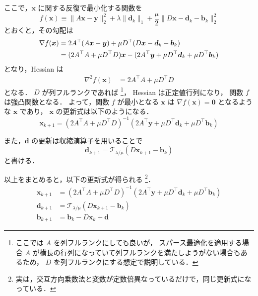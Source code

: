ここで，$\bm{x}$ に関する反復で最小化する関数を
\begin{equation}
    f(\bm{x}) \equiv \|A \bm{x} - \bm{y}\|_2^2 + \lambda \|\bm{d}_k\|_1
    + \frac{\mu}{2} \|D \bm{x} - \bm{d}_k - \bm{b}_k\|_2^2
\end{equation}
とおくと，その勾配は
\begin{align}
    \nabla f(\bm{x})
     & =
    2 A^\top (A \bm{x} - \bm{y}) + \mu D^\top (D \bm{x} - \bm{d}_k - \bm{b}_k)
    \notag \\
     & =
    (2 A^\top A + \mu D^\top D) \bm{x}
    - (2 A^\top \bm{y} + \mu D^\top \bm{d}_k + \mu D^\top \bm{b}_k)
\end{align}
となり，Hessian は
\begin{align}
    \nabla^2 f(\bm{x})
     & =
    2 A^\top A + \mu D^\top D
\end{align}
となる．
$D$ が列フルランクであれば
\footnote{ここでは $A$ を列フルランクにしても良いが，%
    スパース最適化を適用する場合 $A$ が横長の行列になっていて列フルランクを満たしようがない場合もあるため，%
    $D$ を列フルランクにする想定で説明している．}，
Hessian は正定値行列になり，
関数 $f$ は強凸関数となる．
よって，関数 $f$ が最小となる $\bm{x}$ は $\nabla f(\bm{x}) = \bm{0}$ となるような $\bm{x}$ であり，
$\bm{x}$ の更新式は以下のようになる．
\begin{equation}
    \bm{x}_{k+1} =
    (2 A^\top A + \mu D^\top D)^{-1}
    (2 A^\top \bm{y} + \mu D^\top \bm{d}_k + \mu D^\top \bm{b}_k)
\end{equation}

また，$\bm{d}$ の更新は収縮演算子を用いることで
\begin{equation}
    \bm{d}_{k+1} = \mathcal{T}_{\lambda / \mu} (D\bm{x}_{k+1} - \bm{b}_k)
\end{equation}
と書ける．

以上をまとめると，以下の更新式が得られる
\footnote{実は，交互方向乗数法と変数が定数倍異なっているだけで，同じ更新式になっている．}．
\begin{align}
    \bm{x}_{k+1}
     & = (2 A^\top A + \mu D^\top D)^{-1}
    (2 A^\top \bm{y} + \mu D^\top \bm{d}_k + \mu D^\top \bm{b}_k)
    \\
    \bm{d}_{k+1}
     & = \mathcal{T}_{\lambda / \mu} (D\bm{x}_{k+1} - \bm{b}_k)
    \\
    \bm{b}_{k+1}
     & = \bm{b}_k - D \bm{x}_k + \bm{d}
\end{align}

